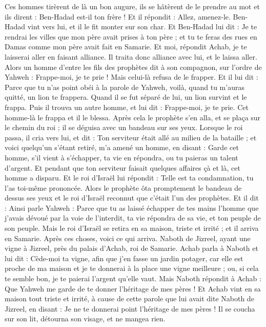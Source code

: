\begin{multicols}{2}
Ces hommes tirèrent de là un bon augure, ils se hâtèrent de le prendre au mot et ils dirent : Ben-Hadad est-il ton frère ! Et il répondit : Allez, amenez-le. Ben-Hadad vint vers lui, et il le fit monter sur son char.
Et Ben-Hadad lui dit : Je te rendrai les villes que mon père avait prises à ton père ; et tu te feras des rues en Damas comme mon père avait fait en Samarie. Et moi, répondit Achab, je te laisserai aller en faisant alliance. Il traita donc alliance avec lui, et le laissa aller.
Alors un homme d'entre les fils des prophètes dit à son compagnon, sur l’ordre de Yahweh : Frappe-moi, je te prie ! Mais celui-là refusa de le frapper.
Et il lui dit : Parce que tu n'as point obéi à la parole de Yahweh, voilà, quand tu m’auras quitté, un lion te frappera. Quand il se fut séparé de lui, un lion survint et le frappa.
Puis il trouva un autre homme, et lui dit : Frappe-moi, je te prie. Cet homme-là le frappa et il le blessa.
Après cela le prophète s'en alla, et se plaça sur le chemin du roi ; il se déguisa avec un bandeau sur ses yeux.
Lorsque le roi passa, il cria vers lui, et dit : Ton serviteur était allé au milieu de la bataille ; et voici quelqu'un s'étant retiré, m'a amené un homme, en disant : Garde cet homme, s'il vient à s'échapper, ta vie en répondra, ou tu paieras un talent d'argent.
Et pendant que ton serviteur faisait quelques affaires çà et là, cet homme a disparu. Et le roi d'Israël lui répondit : Telle est ta condamnation, tu l’as toi-même prononcée.
Alors le prophète ôta promptement le bandeau de dessus ses yeux et le roi d'Israël reconnut que c'était l’un des prophètes.
Et il dit : Ainsi parle Yahweh : Parce que tu as laissé échapper de tes mains l'homme que j'avais dévoué par la voie de l'interdit, ta vie répondra de sa vie, et ton peuple de son peuple.
Mais le roi d'Israël se retira en sa maison, triste et irrité ; et il arriva en Samarie.
\VerseOne{}Après ces choses, voici ce qui arriva. Naboth de Jizreel, ayant une vigne à Jizreel, près du palais d'Achab, roi de Samarie.
Achab parla à Naboth et lui dit : Cède-moi ta vigne, afin que j'en fasse un jardin potager, car elle est proche de ma maison et je te donnerai à la place une vigne meilleure ; ou, si cela te semble bon, je te paierai l'argent qu'elle vaut.
Mais Naboth répondit à Achab : Que Yahweh me garde de te donner l'héritage de mes pères !
Et Achab vint en sa maison tout triste et irrité, à cause de cette parole que lui avait dite Naboth de Jizreel, en disant : Je ne te donnerai point l'héritage de mes pères ! Il se coucha sur son lit, détourna son visage, et ne mangea rien.

\end{multicols}
